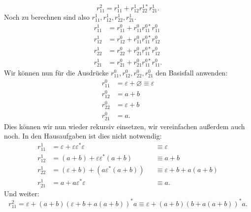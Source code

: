\documentclass[11pt, a4paper]{article}
\let\emptyset\varnothing
\begin{document}
\[
	r_{11}^2 = r_{11}^1 + r_{12}^1 r_{22}^{1\ast} r_{21}^1.
\]
Noch zu berechnen sind also \( r_{11}^1, r_{12}^1, r_{22}^1, r_{21}^1 \).
\begin{align*}
	r_{11}^1 &= r_{11}^0 + r_{11}^0 r_{11}^{0\ast} r_{11}^0\\
	r_{12}^1 &= r_{12}^0 + r_{11}^0 r_{11}^{0\ast} r_{12}^0\\
	r_{22}^1 &= r_{22}^0 + r_{21}^0 r_{11}^{0\ast} r_{12}^0\\
	r_{21}^1 &= r_{21}^0 + r_{21}^0 r_{11}^{0\ast} r_{11}^0.
\end{align*}
Wir können nun für die Ausdrücke \( r_{11}^0, r_{12}^0, r_{22}^0, r_{21}^0 \) den Basisfall anwenden:
\begin{align*}
	r_{11}^0 &= \varepsilon + \emptyset \equiv \varepsilon\\
	r_{12}^0 &= a + b\\
	r_{22}^0 &= \varepsilon + b\\
	r_{21}^0 &= a.
\end{align*}
Dies können wir nun wieder rekursiv einsetzen, wir vereinfachen außerdem auch noch. In den Hausaufgaben ist dies nicht notwendig:
\begin{align*}
	r_{11}^1 &= \varepsilon + \varepsilon \varepsilon^\ast \varepsilon &&\equiv \varepsilon\\
	r_{12}^1 &= (a + b) + \varepsilon \varepsilon^\ast (a + b) &&\equiv a + b\\
	r_{22}^1 &= (\varepsilon + b) + (a \varepsilon^\ast (a + b)) &&\equiv \varepsilon + b + a(a + b)\\
	r_{21}^1 &= a + a \varepsilon^\ast \varepsilon &&\equiv a.
\end{align*}
Und weiter:
\[
	r_{11}^2 = \varepsilon + (a + b) (\varepsilon + b + a(a+b))^\ast a \equiv \varepsilon + (a + b)(b + a(a+b))^\ast a.
\]
\end{document}
